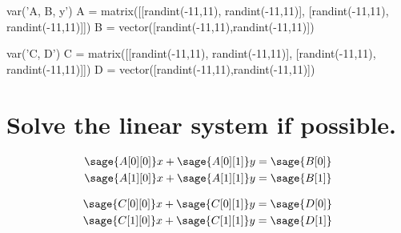 \documentclass{article}
\begin{document}
\begin{sagesilent}
    var('A, B, y')
    A = matrix([[randint(-11,11), randint(-11,11)], [randint(-11,11), randint(-11,11)]])
    B = vector([randint(-11,11),randint(-11,11)])


    var('C, D')
    C = matrix([[randint(-11,11), randint(-11,11)], [randint(-11,11), randint(-11,11)]])
    D = vector([randint(-11,11),randint(-11,11)])

\end{sagesilent}

\section*{Solve the linear system if possible.}
\begin{equation}
\begin{split}
	\sage{A[0][0]} x + \sage{A[0][1]} y &= \sage{B[0]} \\
	\sage{A[1][0]} x + \sage{A[1][1]} y &= \sage{B[1]}
\end{split}
\end{equation}

\begin{equation}
\begin{split}
	\sage{C[0][0]} x + \sage{C[0][1]} y &= \sage{D[0]} \\
	\sage{C[1][0]} x + \sage{C[1][1]} y &= \sage{D[1]}
\end{split}
\end{equation}
\end{document}
